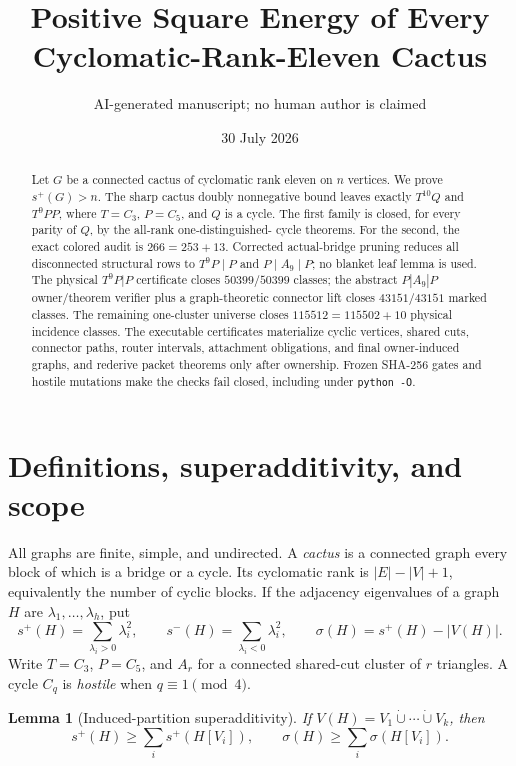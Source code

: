 \documentclass[11pt]{article}
\title{Positive Square Energy of Every Cyclomatic-Rank-Eleven Cactus}
\author{AI-generated manuscript; no human author is claimed}
\date{30 July 2026}
\newtheorem{lemma}[theorem]{Lemma}
\theoremstyle{remark}
\newcommand{\spE}{s^+}
\newcommand{\smE}{s^-}
\newcommand{\sig}{\sigma}
\begin{document}
\maketitle

\begin{abstract}
Let $G$ be a connected cactus of cyclomatic rank eleven on $n$ vertices.  We
prove $s^+(G)>n$.  The sharp cactus doubly nonnegative bound leaves exactly
$T^{10}Q$ and $T^9PP$, where $T=C_3$, $P=C_5$, and $Q$ is a cycle.  The first
family is closed, for every parity of $Q$, by the all-rank one-distinguished-
cycle theorems.  For the second, the exact colored audit is
$266=253+13$.  Corrected actual-bridge pruning reduces all disconnected
structural rows to $T^9P\mid P$ and $P\mid A_9\mid P$; no blanket leaf lemma is
used.  The physical $T^9P|P$ certificate closes $50399/50399$ classes; the
abstract $P|A_9|P$ owner/theorem verifier plus a graph-theoretic connector lift
closes $43151/43151$ marked classes.  The remaining one-cluster universe closes
$115512=115502+10$ physical incidence classes.  The executable certificates
materialize cyclic vertices, shared cuts, connector paths, router intervals,
attachment obligations, and final owner-induced graphs, and rederive packet
theorems only after ownership.  Frozen SHA-256 gates and hostile mutations make
the checks fail closed, including under \texttt{python -O}.
\end{abstract}

\section{Definitions, superadditivity, and scope}

All graphs are finite, simple, and undirected.  A \emph{cactus} is a connected
graph every block of which is a bridge or a cycle.  Its cyclomatic rank is
$|E|-|V|+1$, equivalently the number of cyclic blocks.  If the adjacency
eigenvalues of a graph $H$ are $\lambda_1,\ldots,\lambda_h$, put
\[
 \spE(H)=\sum_{\lambda_i>0}\lambda_i^2,
 \qquad \smE(H)=\sum_{\lambda_i<0}\lambda_i^2,
 \qquad \sig(H)=\spE(H)-|V(H)|.
\]
Write $T=C_3$, $P=C_5$, and $A_r$ for a connected shared-cut cluster of $r$
triangles.  A cycle $C_q$ is \emph{hostile} when $q\equiv1\pmod4$.

\begin{lemma}[Induced-partition superadditivity]\label{lem:super}
If $V(H)=V_1\mathbin{\dot\cup}\cdots\mathbin{\dot\cup}V_k$, then
\[
 \spE(H)\geq\sum_i\spE(H[V_i]),
 \qquad \sig(H)\geq\sum_i\sig(H[V_i]).
\]
\end{lemma}
\end{document}

